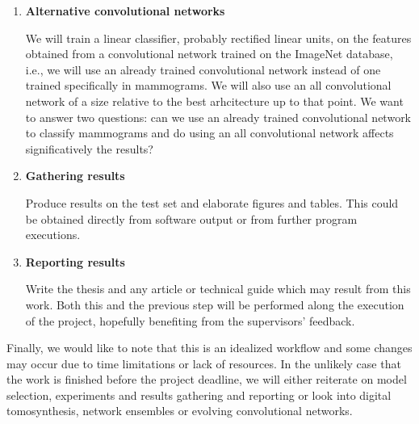 \begin{enumerate}
	\item \textbf{Alternative convolutional networks}

We will train a linear classifier, probably rectified linear units, on the features obtained from a convolutional network trained on the ImageNet database, i.e., we will use an already trained convolutional network instead of one trained specifically in mammograms. We will also use an all convolutional network of a size relative to the best arhcitecture up to that point. We want to answer two questions: can we use an already trained convolutional network to classify mammograms and do using an all convolutional network affects significatively the results?

	\item \textbf{Gathering results}

Produce results on the test set and elaborate figures and tables. This could be obtained directly from software output or from further program executions.
	\item \textbf{Reporting results}

Write the thesis and any article or technical guide which may result from this work. Both this and the previous step will be performed along the execution of the project, hopefully benefiting from the supervisors' feedback.
\end{enumerate}
Finally, we would like to note that this is an idealized workflow and some changes may occur due to time limitations or lack of resources. In the unlikely case that the work is finished before the project deadline, we will either reiterate on model selection, experiments and results gathering and reporting or look into digital tomosynthesis, network ensembles or evolving convolutional networks.

\begin{comment}
La {\it Metodología} (o lo que algunos autores llaman el {\it Método})
 es el proceso o
conjunto de pasos que debe efectuarse para llegar a cumplir con los
objetivos. Esos pasos deben contener  los experimentos a realizar, la forma de
llevarlos a cabo, la evaluación de los resultados, la prueba de las hipótesis,
la respuesta a las preguntas de investigación y el último paso debe ser el
reporte escrito de los resultados.
\end{comment}
